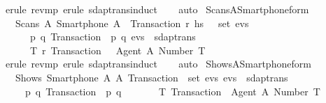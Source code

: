 \begin{isabellebody}
  \isatagproof
  \isamarkupfalse%
  \ {\isacharparenleft}erule\ rev{\isacharunderscore}mp{\isacharcomma}\ erule\ sdaptrans{\isachardot}induct{\isacharparenright}\isanewline
  \ \ \isamarkupfalse%
  \ {\isacharparenleft}auto{\isacharparenright}\isanewline
  \isamarkupfalse%
  \endisatagproof
  {\isafoldproof}%
  \isadelimproof
  \isanewline
  \endisadelimproof
  \isanewline
  \isanewline
  \isamarkupfalse%
  \ Scans{\isacharunderscore}A{\isacharunderscore}Smartphone{\isacharunderscore}form{\isacharunderscore}{}\ {\isacharcolon}\isanewline
  \ \ {\isachardoublequoteopen}{\isasymlbrakk}\ Scans\ A\ {\isacharparenleft}Smartphone\ A{\isacharparenright}\ {\isasymlbrace}\ Transaction{\isacharcomma}\ r{\isacharprime}{\isacharcomma}\ h\isactrlsub s\ {\isasymrbrace}\ {\isasymin}\ set\ evs{\isacharsemicolon}\ \isanewline
  \ \ \ \ \ {\isasymforall}\ p\ q{\isachardot}\ Transaction\ {\isacharequal}\ {\isasymlbrace}p{\isacharcomma}\ q{\isasymrbrace}{\isacharsemicolon}\ evs\ {\isasymin}\ sdaptrans\ {\isasymrbrakk}\isanewline
  \ \ \ \ {\isasymLongrightarrow}\ {\isacharparenleft}{\isasymexists}\ T\ r{\isachardot}\ Transaction\ {\isacharequal}\ {\isasymlbrace}\ Agent\ A{\isacharcomma}\ Number\ T\ {\isasymrbrace}{\isacharparenright}{\isachardoublequoteclose}\isanewline
  \isadelimproof
  \ \ \isanewline
  \ \ %
  \endisadelimproof
  \isatagproof
  \isamarkupfalse%
  \ {\isacharparenleft}erule\ rev{\isacharunderscore}mp{\isacharcomma}\ erule\ sdaptrans{\isachardot}induct{\isacharparenright}\isanewline
  \ \ \isamarkupfalse%
  \ {\isacharparenleft}auto{\isacharparenright}\isanewline
  \isamarkupfalse%
  \endisatagproof
  {\isafoldproof}%
  \isadelimproof
  \isanewline
  \endisadelimproof
  \isanewline
  \isamarkupfalse%
  \ Shows{\isacharunderscore}A{\isacharunderscore}Smartphone{\isacharunderscore}form{\isacharunderscore}{}\ {\isacharcolon}\isanewline
  \ \ {\isachardoublequoteopen}{\isasymlbrakk}\ Shows\ {\isacharparenleft}Smartphone\ A{\isacharparenright}\ A\ Transaction\ {\isasymin}\ set\ evs{\isacharsemicolon}\ evs\ {\isasymin}\ sdaptrans{\isacharsemicolon}\isanewline
  \ \ \ \ {\isasymforall}\ p\ q{\isachardot}\ Transaction\ {\isacharequal}\ {\isasymlbrace}p{\isacharcomma}\ q{\isasymrbrace}\ {\isasymrbrakk}\isanewline
  \ \ \ \ {\isasymLongrightarrow}\ {\isasymexists}\ T{\isachardot}\ Transaction\ {\isacharequal}\ {\isasymlbrace}Agent\ A{\isacharcomma}\ Number\ T{\isasymrbrace}{\isachardoublequoteclose}\isanewline

\end{isabellebody}
